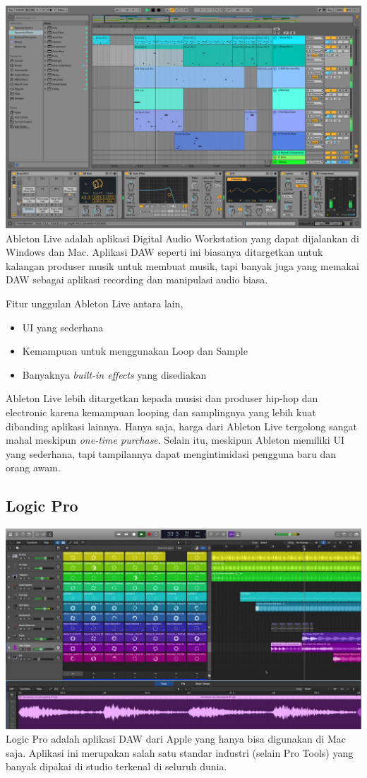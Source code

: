 \includegraphics{images/ableton.jpg} Ableton Live adalah aplikasi
Digital Audio Workstation yang dapat dijalankan di Windows dan Mac.
Aplikasi DAW seperti ini biasanya ditargetkan untuk kalangan produser
musik untuk membuat musik, tapi banyak juga yang memakai DAW sebagai
aplikasi recording dan manipulasi audio biasa.

Fitur unggulan Ableton Live antara lain,

\begin{itemize}
\tightlist
\item
  UI yang sederhana
\item
  Kemampuan untuk menggunakan Loop dan Sample
\item
  Banyaknya \emph{built-in effects} yang disediakan
\end{itemize}

Ableton Live lebih ditargetkan kepada musisi dan produser hip-hop dan
electronic karena kemampuan looping dan samplingnya yang lebih kuat
dibanding aplikasi lainnya. Hanya saja, harga dari Ableton Live
tergolong sangat mahal meskipun \emph{one-time purchase}. Selain itu,
meskipun Ableton memiliki UI yang sederhana, tapi tampilannya dapat
mengintimidasi pengguna baru dan orang awam.

\hypertarget{logic-pro}{%
\subsection{Logic Pro}\label{logic-pro}}

\includegraphics{images/logic.jpg} Logic Pro adalah aplikasi DAW dari
Apple yang hanya bisa digunakan di Mac saja. Aplikasi ini merupakan
salah satu standar industri (selain Pro Tools) yang banyak dipakai di
studio terkenal di seluruh dunia.

